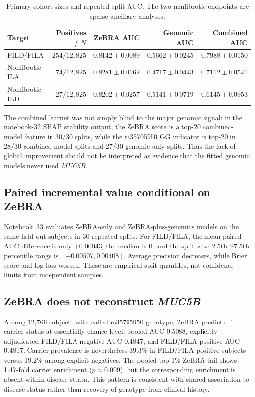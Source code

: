{\figGlobalRepeatedSplits

\begin{table}[!t]
\caption{Primary cohort sizes and repeated-split AUC. The two nonfibrotic endpoints are sparse ancillary analyses.}
\label{tab:auc-repeated}\centering\footnotesize
\begin{tabular}{lrrrr}
\toprule
Target & Positives / $N$ & ZeBRA AUC & Genomic AUC & Combined AUC\\
\midrule
FILD/FILA & $254/12{,}825$ & $0.8142\pm0.0089$ & $0.5662\pm0.0245$ & $0.7988\pm0.0150$\\
Nonfibrotic ILA & $74/12{,}825$ & $0.8281\pm0.0162$ & $0.4717\pm0.0443$ & $0.7112\pm0.0541$\\
Nonfibrotic ILD & $27/12{,}825$ & $0.8202\pm0.0257$ & $0.5141\pm0.0719$ & $0.6145\pm0.0953$\\
\bottomrule
\end{tabular}
\end{table}

The combined learner was not simply blind to the major genomic signal: in the notebook-32 SHAP stability output, the ZeBRA score is a top-20 combined-model feature in 30/30 splits, while the rs35705950 GG indicator is top-20 in 28/30 combined-model splits and 27/30 genomic-only splits. Thus the lack of global improvement should not be interpreted as evidence that the fitted genomic models never used \textit{MUC5B}.

\subsection{Paired incremental value conditional on ZeBRA}
Notebook~33 evaluates ZeBRA-only and ZeBRA-plus-genomics models on the same held-out subjects in 30 repeated splits. For FILD/FILA, the mean paired AUC difference is only $+0.00043$, the median is 0, and the split-wise 2.5th--97.5th percentile range is $[-0.00507,0.00408]$. Average precision decreases, while Brier score and log loss worsen. These are empirical split quantiles, not confidence limits from independent samples.

\figIncrementalAUC

\subsection{ZeBRA does not reconstruct \textit{MUC5B}}
Among 12,766 subjects with called rs35705950 genotype, ZeBRA predicts T-carrier status at essentially chance level: pooled AUC 0.5088, explicitly adjudicated FILD/FILA-negative AUC 0.4847, and FILD/FILA-positive AUC 0.4817. Carrier prevalence is nevertheless 39.3\% in FILD/FILA-positive subjects versus 19.2\% among explicit negatives. The pooled top 1\% ZeBRA tail shows 1.47-fold carrier enrichment ($p\approx0.009$), but the corresponding enrichment is absent within disease strata. This pattern is consistent with shared association to disease status rather than recovery of genotype from clinical history.

}

